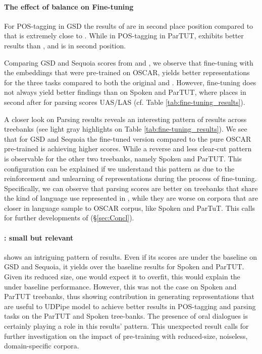 \paragraph{The effect of balance on Fine-tuning}
For POS-tagging in GSD the results of \ELMooscar are in second place position compared to \ELMocoscar that is extremely close to \ELMowiki. While in POS-tagging in ParTUT, \ELMowiki exhibits better results than \ELMooscar, and \ELMocoscar is in second position.

Comparing GSD and Sequoia scores from \ELMooscar and \ELMocoscar, we observe that fine-tuning with \Cabernet the embeddings that were pre-trained on OSCAR, yields better representations for the three tasks compared to both the original \ELMooscar and \ELMococa. However, fine-tuning does not always yield better findings than \ELMooscar on Spoken and ParTUT, where \ELMocoscar places in second after \ELMooscar for parsing scores UAS/LAS (cf. Table \ref{tab:fine-tuning_results}).

A closer look on Parsing results reveals an interesting pattern of results across treebanks (see light gray highlights on Table \ref{tab:fine-tuning_results}). We see that for GSD and Sequoia the \Cabernet fine-tuned version \ELMocoscar compared to the pure OSCAR pre-trained \ELMooscar is achieving higher scores. While a reverse and less clear-cut pattern is observable for the other two treebanks, namely Spoken and ParTUT. This configuration can be explained if we understand this pattern as due to the reinforcement and unlearning of \ELMooscar representations during the process of fine-tuning. Specifically, we can observe that parsing scores are better on treebanks that share the kind of language use represented in \Cabernet, while they are worse on corpora that are closer in language sample to OSCAR corpus, like Spoken and ParTuT. This calls for further developments of \Cabernet (§\ref{sec:Concl}).

\paragraph{\ELMocbt: small but relevant}
\ELMocbt shows an intriguing pattern of results. Even if its scores are under the baseline on GSD and Sequoia, it yields over the baseline results for Spoken and ParTUT. Given its reduced size, one would expect it to overfit, this would explain the under baseline performance. However, this was not the case on Spoken and ParTUT treebanks, thus showing \ELMocbt contribution in generating representations that are useful to UDPipe model to achieve better results in POS-tagging and parsing tasks on the ParTUT and Spoken tree-banks. The presence of oral dialogues is certainly playing a role in this results' pattern. This unexpected result calls for further investigation on the impact of pre-training with reduced-size, noiseless, domain-specific corpora.


